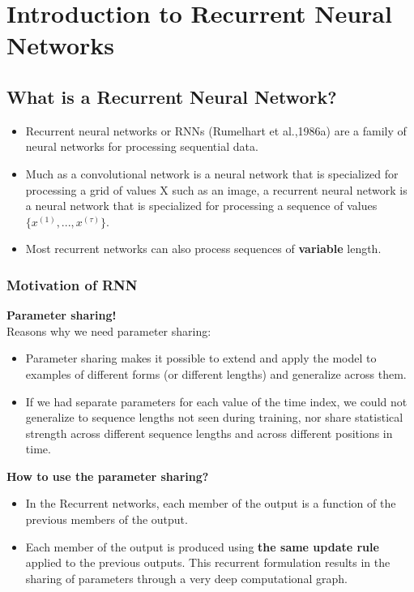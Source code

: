 \chapter{Introduction to Recurrent Neural Networks}
	\section{What is a Recurrent Neural Network?}
	
	\begin{itemize}
		\item Recurrent neural networks or RNNs (Rumelhart et al.,1986a) are a family of
		neural networks for processing sequential data.
		\item  Much as a convolutional network is a neural network that is specialized for processing a grid of values X such as an image, a recurrent neural network is a neural network that is specialized for
		processing a sequence of values $\{x^{(1)}, . . . , x^{(\tau)}\}$.
		\item Most recurrent networks can also process sequences of \textbf{variable} length.
	\end{itemize}
	
	\subsection{Motivation of RNN}
		\textbf{Parameter sharing!} \\
		Reasons why we need parameter sharing:
		\begin{itemize}
			\item  Parameter sharing makes it possible to extend and apply the model to examples of different forms
			(or different lengths) and generalize across them.
			\item  If we had separate parameters for each value of the time index, we could not generalize to sequence lengths not seen during training, nor share statistical strength across different sequence lengths
			and across different positions in time. 
		\end{itemize}
	
		\textbf{How to use the parameter sharing?}
		\begin{itemize}
			\item In the Recurrent networks, each member of the
			output is a function of the previous members of the output.	
			\item Each member of the output is produced using \textbf{the same update rule} applied to the previous outputs. This recurrent formulation results in the sharing of parameters through a very deep computational graph.
		\end{itemize}

